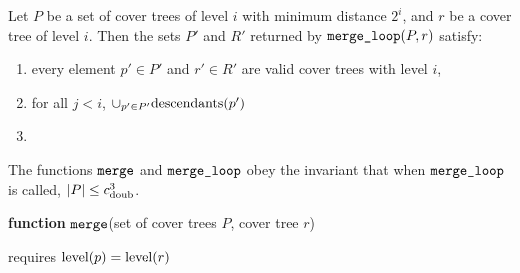 \documentclass[../main.tex]{subfiles}
\newcommand{\doubnum}{c_\textnormal{doub}}
\newcommand{\mkfunction}[1]{\ifmmode{\text{{#1}}}}
\newcommand{\level}[1]      {\mkfunction{level}({#1})}
\newcommand{\descendants}[1]{\mkfunction{descendants}({#1})}
\newcommand{\mkprocedure}[1]{\ifmmode \textnormal{\ttfamily {#1}}}
\newcommand{\ctmergeloop}{\mkprocedure{merge\_loop}}
\newcommand{\ctmerge}{\ensuremath{\textnormal{\ttfamily merge}}}
\begin{document}
{\begin{lemma}
    Let $P$ be a set of cover trees of level $i$ with minimum distance $2^i$, 
    and $r$ be a cover tree of level $i$.
    Then the sets $P'$ and $R'$ returned by $\ctmergeloop(P,r)$ satisfy:
    \begin{enumerate}
        \item every element $p' \in P'$ and $r'\in R'$ are valid cover trees with level $i$,
        \item for all $j<i$, $\cup_{p' \in P'} \descendants {p'}$
        \item 
    \end{enumerate}
\end{lemma}

\begin{lemma}
    The functions $\ctmerge$ and $\ctmergeloop$ obey the invariant that when $\ctmergeloop$ is called, $|P| \le \doubnum^3$.
\end{lemma}


\newpage
\begin{algorithm}[H]
    \label{alg:merge}
    \vspace{0.1in}
    {\bfseries function} \ctmerge(set of cover trees $P$, cover tree $r$)

    requires $\level{p} = \level{r}$


\end{algorithm}}
\end{document}
